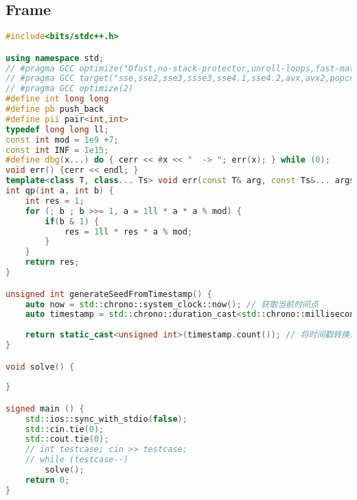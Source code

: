 \subsection{Frame}
\begin{lstlisting}[language=c++]
#include<bits/stdc++.h>

using namespace std;
// #pragma GCC optimize("Ofast,no-stack-protector,unroll-loops,fast-math")
// #pragma GCC target("sse,sse2,sse3,ssse3,sse4.1,sse4.2,avx,avx2,popcnt,tune=native")
// #pragma GCC optimize(2)
#define int long long 
#define pb push_back
#define pii pair<int,int>
typedef long long ll;
const int mod = 1e9 +7; 
const int INF = 1e15;
#define dbg(x...) do { cerr << #x << "  -> "; err(x); } while (0);
void err() {cerr << endl; }
template<class T, class... Ts> void err(const T& arg, const Ts&... args) {cerr << arg << " "; err(args...); }
int qp(int a, int b) {
    int res = 1;
    for (; b ; b >>= 1, a = 1ll * a * a % mod) {
        if(b & 1) {
            res = 1ll * res * a % mod;
        }
    }
    return res;
}

unsigned int generateSeedFromTimestamp() {
    auto now = std::chrono::system_clock::now(); // 获取当前时间点
    auto timestamp = std::chrono::duration_cast<std::chrono::milliseconds>(now.time_since_epoch()); // 转换为毫秒级的时间戳
 
    return static_cast<unsigned int>(timestamp.count()); // 将时间戳转换为整数种子值
}

void solve() {
    
}

signed main () {
    std::ios::sync_with_stdio(false);
    std::cin.tie(0);
    std::cout.tie(0);
    // int testcase; cin >> testcase;
    // while (testcase--)
        solve();
    return 0;
}
\end{lstlisting}